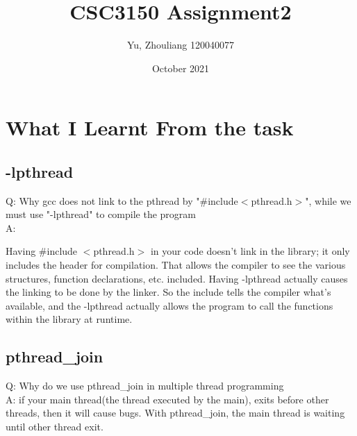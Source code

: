 \documentclass{article}
\title{CSC3150 Assignment2}
\author{Yu, Zhouliang 120040077 }
\date{October 2021}
\begin{document}
\maketitle



\section{What I Learnt From the task}
\subsection{-lpthread}
Q: Why gcc does not link to the pthread by "\#include$<$pthread.h$>$", while we must use "-lpthread"
to compile the program
\\
A: 

Having \#include $<$pthread.h$>$ in your code doesn't link in the library; it only includes the header for compilation. That allows the compiler to see the various structures, function declarations, etc. included. Having -lpthread actually causes the linking to be done by the linker. So the include tells the compiler what's available, and the -lpthread actually allows the program to call the functions within the library at runtime.
\subsection{pthread\_join}
Q: Why do we use pthread\_join in multiple thread programming
\\
A: if your main thread(the thread executed by the main), exits before other threads, then it will cause bugs. With pthread\_join, the main thread is waiting until other thread exit.
\end{document}
